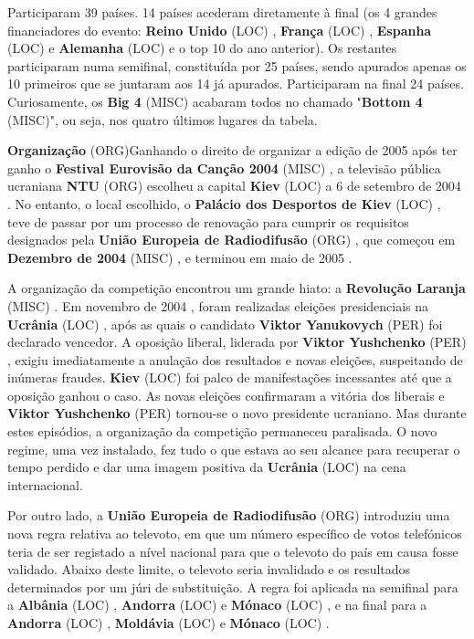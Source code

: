 \documentclass[12pt,a4paper]{article}
\begin{document}
Participaram 39 países. 14 países acederam diretamente à final (os 4 grandes financiadores do evento: \textbf{Reino Unido} (LOC) , \textbf{França} (LOC) , \textbf{Espanha} (LOC) e \textbf{Alemanha} (LOC) e o top 10 do ano anterior). Os restantes participaram numa semifinal, constituída por 25 países, sendo apurados apenas os 10 primeiros que se juntaram aos 14 já apurados. Participaram na final 24 países. Curiosamente, os \textbf{Big 4} (MISC) acabaram todos no chamado "\textbf{Bottom 4} (MISC)", ou seja, nos quatro últimos lugares da tabela.



\textbf{Organização} (ORG)Ganhando o direito de organizar a edição de 2005 após ter ganho o \textbf{Festival Eurovisão da Canção 2004} (MISC) , a televisão pública ucraniana \textbf{NTU} (ORG) escolheu a capital \textbf{Kiev} (LOC) a 6 de setembro de 2004 . No entanto, o local escolhido, o \textbf{Palácio dos Desportos de Kiev} (LOC) , teve de passar por um processo de renovação para cumprir os requisitos designados pela \textbf{União Europeia de Radiodifusão} (ORG) , que começou em \textbf{Dezembro de 2004} (MISC) , e terminou em maio de 2005 .

A organização da competição encontrou um grande hiato: a \textbf{Revolução Laranja} (MISC) . Em novembro de 2004 , foram realizadas eleições presidenciais na \textbf{Ucrânia} (LOC) , após as quais o candidato \textbf{Viktor Yanukovych} (PER) foi declarado vencedor. A oposição liberal, liderada por \textbf{Viktor Yushchenko} (PER) , exigiu imediatamente a anulação dos resultados e novas eleições, suspeitando de inúmeras fraudes. \textbf{Kiev} (LOC) foi palco de manifestações incessantes até que a oposição ganhou o caso. As novas eleições confirmaram a vitória dos liberais e \textbf{Viktor Yushchenko} (PER) tornou-se o novo presidente ucraniano. Mas durante estes episódios, a organização da competição permaneceu paralisada. O novo regime, uma vez instalado, fez tudo o que estava ao seu alcance para recuperar o tempo perdido e dar uma imagem positiva da \textbf{Ucrânia} (LOC) na cena internacional.

Por outro lado, a \textbf{União Europeia de Radiodifusão} (ORG) introduziu uma nova regra relativa ao televoto, em que um número específico de votos telefónicos teria de ser registado a nível nacional para que o televoto do país em causa fosse validado. Abaixo deste limite, o televoto seria invalidado e os resultados determinados por um júri de substituição. A regra foi aplicada na semifinal para a \textbf{Albânia} (LOC) , \textbf{Andorra} (LOC) e \textbf{Mónaco} (LOC) , e na final para a \textbf{Andorra} (LOC) , \textbf{Moldávia} (LOC) e \textbf{Mónaco} (LOC) .
\end{document}
